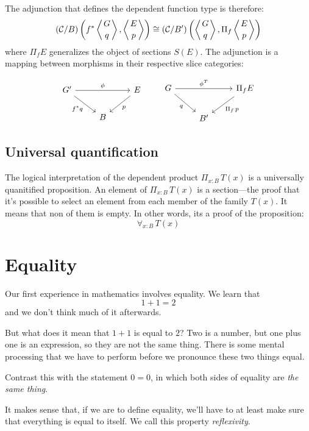 \documentclass[DaoFP]{subfiles}
\begin{document}
The adjunction that defines the dependent function type is therefore:
\[ (\mathcal{C}/B) \left( f^* \left \langle {G \atop q} \right \rangle, \left \langle {E \atop p} \right \rangle \right) \cong  (\mathcal{C}/B')\left( \left \langle {G \atop q} \right \rangle, \Pi_f \left \langle {E \atop p } \right \rangle \right) \]
where $\Pi_f E$ generalizes the object of sections $S(E)$. The adjunction is a mapping between morphisms in their respective slice categories:

\[
 \begin{tikzcd}
 G'
 \arrow[rr, "\phi"]
 \arrow[rd, "f^* q"']
 &&E
 \arrow[dl, "p"]
 \\
 &B
 \end{tikzcd}
 \hspace{20pt}
\begin{tikzcd}
 G
 \arrow[rr, "\phi^T"]
 \arrow[rd, "q"']
 && \Pi_f E
 \arrow[ld, "\Pi_f \, p"]
 \\
 & B'
  \end{tikzcd}
\]

\subsection{Universal quantification}

The logical interpretation of the dependent product $\Pi_{x : B} \, T(x)$ is a universally quanitified proposition. An element of $\Pi_{x : B} \, T(x)$ is a section---the proof that it's possible to select an element from each member of the family $T(x)$. It means that non of them is empty. In other words, its a proof of the proposition:
\[ \forall_{x : B}\, T(x) \]

\section{Equality}

Our first experience in mathematics involves equality. We learn that 
\[1+1=2\] 
and we don't think much of it afterwards. 

But what does it mean that $1+1$ is equal to $2$? Two is a number, but one plus one is an expression, so they are not the same thing. There is some mental processing that we have to perform before we pronounce these two things equal. 

Contrast this with the statement $0 = 0$, in which both sides of equality are \emph{the same thing}. 

It makes sense that, if we are to define equality, we'll have to at least make sure that everything is equal to itself. We call this property \emph{reflexivity}. 
\end{document}
